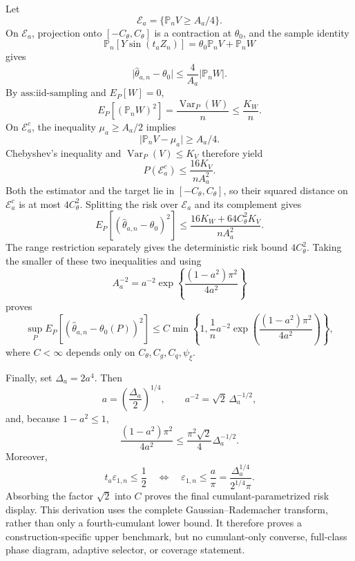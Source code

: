 Let
\[
 \mathcal E_a=\{\mathbb P_nV\geq A_a/4\}.
\]
On \(\mathcal E_a\), projection onto \([-C_\theta,C_\theta]\) is a contraction at \(\theta_0\), and the sample identity
\[
 \mathbb P_n[Y\sin(t_aZ_n)]
 =\theta_0\mathbb P_nV+\mathbb P_nW
\]
gives
\[
 \lvert\widehat\theta_{a,n}-\theta_0\rvert
 \leq\frac{4}{A_a}\lvert\mathbb P_nW\rvert.
\]
By \(\text{ass:iid-sampling}\) and \(E_P[W]=0\),
\[
 E_P[(\mathbb P_nW)^2]
 =\frac{\operatorname{Var}_P(W)}{n}
 \leq\frac{K_W}{n}.
\]
On \(\mathcal E_a^c\), the inequality \(\mu_a\geq A_a/2\) implies
\[
 \lvert\mathbb P_nV-\mu_a\rvert\geq A_a/4.
\]
Chebyshev's inequality and \(\operatorname{Var}_P(V)\leq K_V\) therefore yield
\[
 P(\mathcal E_a^c)
 \leq\frac{16K_V}{nA_a^2}.
\]
Both the estimator and the target lie in \([-C_\theta,C_\theta]\), so their squared distance on \(\mathcal E_a^c\) is at most \(4C_\theta^2\).  Splitting the risk over \(\mathcal E_a\) and its complement gives
\[
 E_P[(\widehat\theta_{a,n}-\theta_0)^2]
 \leq\frac{16K_W+64C_\theta^2K_V}{nA_a^2}.
\]
The range restriction separately gives the deterministic risk bound \(4C_\theta^2\).  Taking the smaller of these two inequalities and using
\[
 A_a^{-2}
 =a^{-2}\exp\!\left\{\frac{(1-a^2)\pi^2}{4a^2}\right\}
\]
proves
\[
 \sup_P E_P[(\widehat\theta_{a,n}-\theta_0(P))^2]
 \leq
 C\min\!\left\{
  1,\frac{1}{n}a^{-2}
  \exp\!\left(\frac{(1-a^2)\pi^2}{4a^2}\right)
 \right\},
\]
where \(C<\infty\) depends only on \(C_\theta,C_g,C_q,\psi_\xi\).

Finally, set \(\Delta_a=2a^4\).  Then
\[
 a=\left(\frac{\Delta_a}{2}\right)^{1/4},
 \qquad
 a^{-2}=\sqrt2\,\Delta_a^{-1/2},
\]
and, because \(1-a^2\leq1\),
\[
 \frac{(1-a^2)\pi^2}{4a^2}
 \leq\frac{\pi^2\sqrt2}{4}\Delta_a^{-1/2}.
\]
Moreover,
\[
 t_a\varepsilon_{1,n}\leq\frac12
 \quad\Longleftrightarrow\quad
 \varepsilon_{1,n}\leq\frac{a}{\pi}
 =\frac{\Delta_a^{1/4}}{2^{1/4}\pi}.
\]
Absorbing the factor \(\sqrt2\) into \(C\) proves the final cumulant-parametrized risk display.  This derivation uses the complete Gaussian--Rademacher transform, rather than only a fourth-cumulant lower bound.  It therefore proves a construction-specific upper benchmark, but no cumulant-only converse, full-class phase diagram, adaptive selector, or coverage statement.